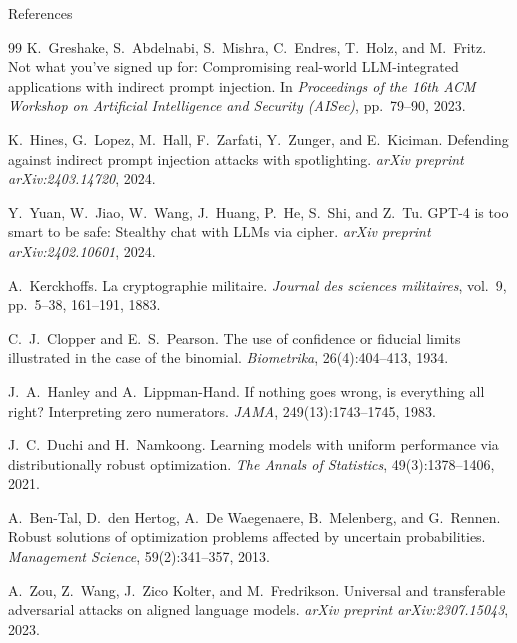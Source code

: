 \documentclass[aspectratio=169,11pt]{beamer}
\begin{document}
\begin{frame}[allowframebreaks]{References}
  \tiny
  \begin{thebibliography}{99}
      K.~Greshake, S.~Abdelnabi, S.~Mishra, C.~Endres, T.~Holz, and M.~Fritz.
      \newblock Not what you've signed up for: Compromising real-world LLM-integrated applications with indirect prompt injection.
      \newblock In \emph{Proceedings of the 16th ACM Workshop on Artificial Intelligence and Security (AISec)}, pp.~79--90, 2023.

      K.~Hines, G.~Lopez, M.~Hall, F.~Zarfati, Y.~Zunger, and E.~Kiciman.
      \newblock Defending against indirect prompt injection attacks with spotlighting.
      \newblock \emph{arXiv preprint arXiv:2403.14720}, 2024.

      Y.~Yuan, W.~Jiao, W.~Wang, J.~Huang, P.~He, S.~Shi, and Z.~Tu.
      \newblock GPT-4 is too smart to be safe: Stealthy chat with LLMs via cipher.
      \newblock \emph{arXiv preprint arXiv:2402.10601}, 2024.

      A.~Kerckhoffs.
      \newblock La cryptographie militaire.
      \newblock \emph{Journal des sciences militaires}, vol.~9, pp.~5--38, 161--191, 1883.

      C.~J.~Clopper and E.~S.~Pearson.
      \newblock The use of confidence or fiducial limits illustrated in the case of the binomial.
      \newblock \emph{Biometrika}, 26(4):404--413, 1934.

      J.~A.~Hanley and A.~Lippman-Hand.
      \newblock If nothing goes wrong, is everything all right? Interpreting zero numerators.
      \newblock \emph{JAMA}, 249(13):1743--1745, 1983.

      J.~C.~Duchi and H.~Namkoong.
      \newblock Learning models with uniform performance via distributionally robust optimization.
      \newblock \emph{The Annals of Statistics}, 49(3):1378--1406, 2021.

      A.~Ben-Tal, D.~den Hertog, A.~De Waegenaere, B.~Melenberg, and G.~Rennen.
      \newblock Robust solutions of optimization problems affected by uncertain probabilities.
      \newblock \emph{Management Science}, 59(2):341--357, 2013.

      A.~Zou, Z.~Wang, J.~Zico Kolter, and M.~Fredrikson.
      \newblock Universal and transferable adversarial attacks on aligned language models.
      \newblock \emph{arXiv preprint arXiv:2307.15043}, 2023.


\end{thebibliography}
\end{frame}
\end{document}
